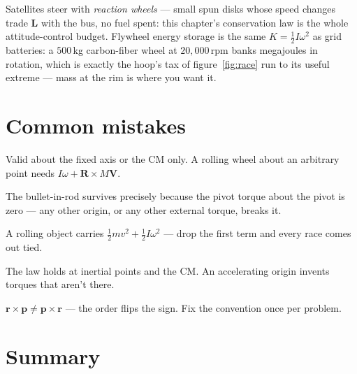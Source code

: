 Satellites steer with \emph{reaction wheels} --- small spun disks whose
speed changes trade $\mathbf L$ with the bus, no fuel spent: this chapter's
conservation law is the whole attitude-control budget. Flywheel energy
storage is the same $K=\tfrac12I\omega^{2}$ as grid batteries: a
$500$\,kg carbon-fiber wheel at $20{,}000$\,rpm banks megajoules in
rotation, which is exactly the hoop's tax of
figure~\ref{fig:race} run to its useful extreme --- mass at the rim is
where you want it.

\section{Common mistakes}\label{sec:ang-mistakes}

\begin{tripwire}[$L=I\omega$ about the wrong axis]
Valid about the fixed axis or the CM only. A rolling wheel about an
arbitrary point needs $I\omega+\mathbf R\times M\mathbf V$.
\end{tripwire}
\begin{tripwire}
The bullet-in-rod survives precisely because the pivot torque about the
pivot is zero --- any other origin, or any other external torque, breaks it.
\end{tripwire}
\begin{tripwire}
A rolling object carries $\tfrac12mv^{2}+\tfrac12I\omega^{2}$ --- drop the
first term and every race comes out tied.
\end{tripwire}
\begin{tripwire}[$\tau=dL/dt$ about a non-inertial origin]
The law holds at inertial points and the CM. An accelerating origin
invents torques that aren't there.
\end{tripwire}
\begin{tripwire}
$\mathbf r\times\mathbf p\neq\mathbf p\times\mathbf r$ --- the order flips
the sign. Fix the convention once per problem.
\end{tripwire}

\section{Summary}\label{sec:ang-summary}


